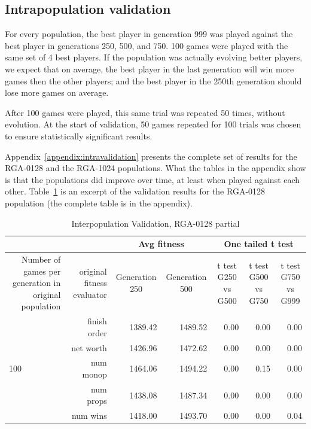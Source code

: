 \subsection{Intrapopulation validation}

For every population, the best player in generation 999 was played against
the best player in generations 250, 500, and 750. 100 games were played with the
same set of 4 best players. If the population was actually evolving better
players, we expect that on average, the best player in the last generation will
win more games then the other players; and the best player in the 250th
generation should lose more games on average. 

After 100 games were played, this same trial was repeated 50 times, without
evolution. At the start of validation, 50 games repeated for 100 trials was
chosen to ensure statistically significant results.

Appendix~\ref{appendix:intravalidation} presents the complete set of results for
the RGA-0128 and the RGA-1024 populations. What the tables in the appendix show
is that the populations did improve over time, at least when played against each
other. Table~\ref{tab:validationRGA0128} is an excerpt of the validation results
for the RGA-0128 population (the complete table is in the appendix). 

\begin{table}[htbp]
  \centering
  \caption{Interpopulation Validation, RGA-0128 partial}
    \begin{tabular}{rrrrrrr}
    \toprule
           &        & \multicolumn{2}{c}{Avg fitness} & \multicolumn{3}{c}{One tailed t test} \\
    \midrule
    Number of games per generation in original population & original fitness evaluator & \multicolumn{1}{c}{Generation 250} & \multicolumn{1}{c}{Generation 500} & \multicolumn{1}{c}{t test G250 vs G500} & \multicolumn{1}{c}{t test G500 vs G750} & \multicolumn{1}{c}{t test G750 vs G999} \\
    \multicolumn{1}{l}{\multirow{5}[10]{*}{100}} & finish order & 1389.42 & 1489.52 & 0.00   & 0.00   & 0.00 \\
    \multicolumn{1}{l}{} & net worth & 1426.96 & 1472.62 & 0.00   & 0.00   & 0.00 \\
    \multicolumn{1}{l}{} & num monop & 1464.06 & 1494.22 & 0.00   & 0.15   & 0.00 \\
    \multicolumn{1}{l}{} & num props & 1438.08 & 1487.34 & 0.00   & 0.00   & 0.00 \\
    \multicolumn{1}{l}{} & num wins & 1418.00 & 1493.70 & 0.00   & 0.00   & 0.04 \\
    \bottomrule
    \end{tabular}%
  \label{tab:validationRGA0128}%
\end{table}%

